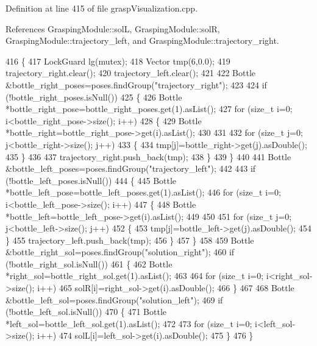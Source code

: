 Definition at line 415 of file grasp\+Visualization.\+cpp.



References Grasping\+Module\+::solL, Grasping\+Module\+::solR, Grasping\+Module\+::trajectory\+\_\+left, and Grasping\+Module\+::trajectory\+\_\+right.


\begin{DoxyCode}
416 \{
417     LockGuard lg(mutex);
418     Vector tmp(6,0.0);
419     trajectory_right.clear();
420     trajectory_left.clear();
421 
422     Bottle &bottle\_right\_poses=poses.findGroup(\textcolor{stringliteral}{"trajectory\_right"});
423 
424     \textcolor{keywordflow}{if} (!bottle\_right\_poses.isNull())
425     \{
426         Bottle *bottle\_right\_pose=bottle\_right\_poses.get(1).asList();
427         \textcolor{keywordflow}{for} (\textcolor{keywordtype}{size\_t} i=0; i<bottle\_right\_pose->size(); i++)
428         \{
429             Bottle *bottle\_right=bottle\_right\_pose->get(i).asList();
430 
431 
432             \textcolor{keywordflow}{for} (\textcolor{keywordtype}{size\_t} j=0; j<bottle\_right->size(); j++)
433             \{
434                 tmp[j]=bottle\_right->get(j).asDouble();
435             \}
436 
437             trajectory_right.push\_back(tmp);
438         \}
439     \}
440 
441     Bottle &bottle\_left\_poses=poses.findGroup(\textcolor{stringliteral}{"trajectory\_left"});
442 
443     \textcolor{keywordflow}{if} (!bottle\_left\_poses.isNull())
444     \{
445         Bottle *bottle\_left\_pose=bottle\_left\_poses.get(1).asList();
446         \textcolor{keywordflow}{for} (\textcolor{keywordtype}{size\_t} i=0; i<bottle\_left\_pose->size(); i++)
447         \{
448             Bottle *bottle\_left=bottle\_left\_pose->get(i).asList();
449 
450 
451             \textcolor{keywordflow}{for} (\textcolor{keywordtype}{size\_t} j=0; j<bottle\_left->size(); j++)
452             \{
453                 tmp[j]=bottle\_left->get(j).asDouble();
454             \}
455             trajectory_left.push\_back(tmp);
456         \}
457     \}
458 
459     Bottle &bottle\_right\_sol=poses.findGroup(\textcolor{stringliteral}{"solution\_right"});
460     \textcolor{keywordflow}{if} (!bottle\_right\_sol.isNull())
461     \{
462         Bottle *right\_sol=bottle\_right\_sol.get(1).asList();
463 
464         \textcolor{keywordflow}{for} (\textcolor{keywordtype}{size\_t} i=0; i<right\_sol->size(); i++)
465             solR[i]=right\_sol->get(i).asDouble();
466     \}
467 
468     Bottle &bottle\_left\_sol=poses.findGroup(\textcolor{stringliteral}{"solution\_left"});
469     \textcolor{keywordflow}{if} (!bottle\_left\_sol.isNull())
470     \{
471         Bottle *left\_sol=bottle\_left\_sol.get(1).asList();
472 
473         \textcolor{keywordflow}{for} (\textcolor{keywordtype}{size\_t} i=0; i<left\_sol->size(); i++)
474             solL[i]=left\_sol->get(i).asDouble();
475     \}
476 \}
\end{DoxyCode}
